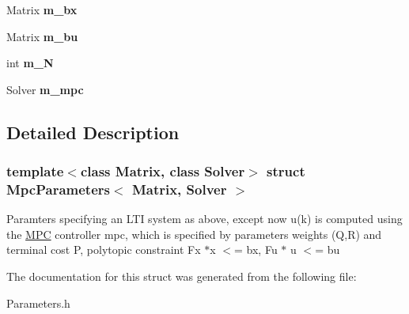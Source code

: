 \begin{DoxyCompactItemize}
Matrix {\bfseries m\+\_\+bx}
\item 
\mbox{\label{structMpcParameters_aa73c5be2bd31a8e6c688ad20f735a9c3}} 
Matrix {\bfseries m\+\_\+bu}
\item 
\mbox{\label{structMpcParameters_a11b5664a2c91346e4023d7f4617f7bbb}} 
int {\bfseries m\+\_\+N}
\item 
\mbox{\label{structMpcParameters_a35a521d3eceb5ffde01196bc67527e69}} 
Solver {\bfseries m\+\_\+mpc}
\end{DoxyCompactItemize}


\subsection{Detailed Description}
\subsubsection*{template$<$class Matrix, class Solver$>$\newline
struct Mpc\+Parameters$<$ Matrix, Solver $>$}

Paramters specifying an L\+TI system as above, except now u(k) is computed using the \mbox{\hyperlink{classMPC}{M\+PC}} controller mpc, which is specified by parameters weights (Q,R) and terminal cost P, polytopic constraint Fx $\ast$x $<$= bx, Fu $\ast$ u $<$= bu 

The documentation for this struct was generated from the following file\+:\begin{DoxyCompactItemize}
\item 
Parameters.\+h\end{DoxyCompactItemize}
